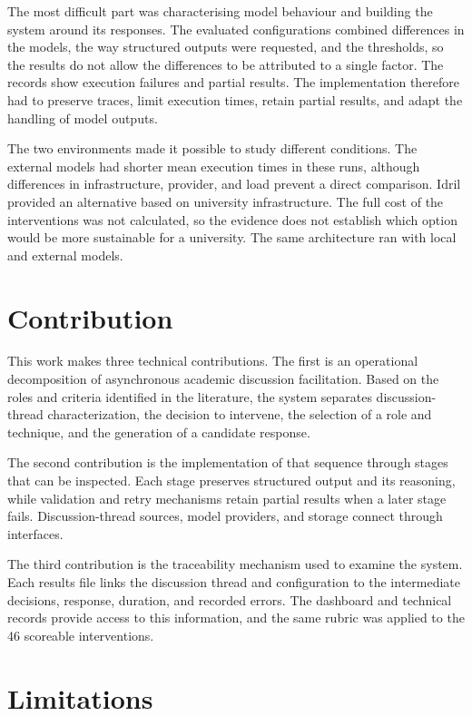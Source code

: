 The most difficult part was characterising model behaviour and building the system around its responses. The evaluated configurations combined differences in the models, the way structured outputs were requested, and the thresholds, so the results do not allow the differences to be attributed to a single factor. The records show execution failures and partial results. The implementation therefore had to preserve traces, limit execution times, retain partial results, and adapt the handling of model outputs.

The two environments made it possible to study different conditions. The external models had shorter mean execution times in these runs, although differences in infrastructure, provider, and load prevent a direct comparison. Idril provided an alternative based on university infrastructure. The full cost of the interventions was not calculated, so the evidence does not establish which option would be more sustainable for a university. The same architecture ran with local and external models.

\section{Contribution}

This work makes three technical contributions. The first is an operational decomposition of asynchronous academic discussion facilitation. Based on the roles and criteria identified in the literature, the system separates discussion-thread characterization, the decision to intervene, the selection of a role and technique, and the generation of a candidate response.

The second contribution is the implementation of that sequence through stages that can be inspected. Each stage preserves structured output and its reasoning, while validation and retry mechanisms retain partial results when a later stage fails. Discussion-thread sources, model providers, and storage connect through interfaces.

The third contribution is the traceability mechanism used to examine the system. Each results file links the discussion thread and configuration to the intermediate decisions, response, duration, and recorded errors. The dashboard and technical records provide access to this information, and the same rubric was applied to the 46 scoreable interventions.

\section{Limitations}

